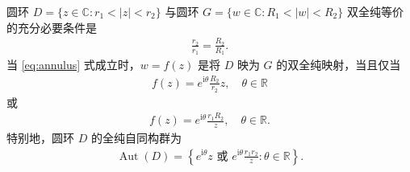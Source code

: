 \documentclass[../../main.tex]{subfiles}%
\begin{document}
\begin{proposition}\label{proposition:例6.1.6复变}
圆环 \(D = \{z \in \mathbb{C}: r_1 < |z| < r_2\}\) 与圆环 \(G = \{w \in \mathbb{C}: R_1 < |w| < R_2\}\) 双全纯等价的充分必要条件是
\begin{align}
\frac{r_2}{r_1} = \frac{R_2}{R_1}. \label{eq:annulus}
\end{align}
当 \eqref{eq:annulus} 式成立时，\(w = f(z)\) 是将 \(D\) 映为 \(G\) 的双全纯映射，当且仅当
\begin{align}
f(z) = e^{\mathrm{i}\theta } \frac{R_2}{r_2} z, \quad \theta \in \mathbb{R} \label{eq:annulus_map1}
\end{align}
或
\begin{align}
f(z) = e^{\mathrm{i}\theta } \frac{r_1 R_2}{z}, \quad \theta \in \mathbb{R}. \label{eq:annulus_map2}
\end{align}
特别地，圆环 \(D\) 的全纯自同构群为
\begin{align*}
\operatorname{Aut}(D) = \left\{e^{\mathrm{i}\theta } z \text{ 或 } e^{\mathrm{i}\theta } \frac{r_1 r_2}{z}: \theta \in \mathbb{R}\right\}.
\end{align*}
\end{proposition}
\end{document}
